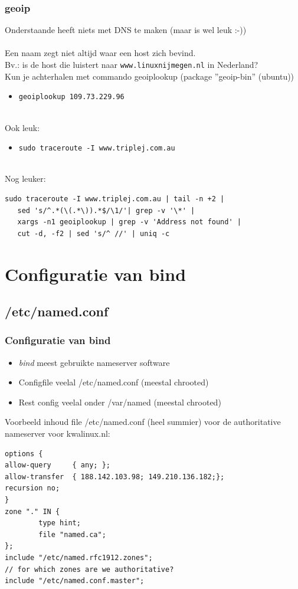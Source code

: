 \begin{styleframefrag}
        \frametitle{geoip}
{\footnotesize Onderstaande heeft niets met DNS te maken (maar is wel leuk :-))}
~\\
~\\
Een naam zegt niet altijd waar een host zich bevind.\\
Bv.: is de host die luistert naar {\tt www.linuxnijmegen.nl} in Nederland?\\
Kun je achterhalen met commando geoiplookup (package ''geoip-bin'' (ubuntu))
\begin{itemize}
	\item[] {\tt geoiplookup 109.73.229.96}
\end{itemize}
~\\
\pause
Ook leuk:
\begin{itemize}
	\item[] {\tt sudo traceroute -I www.triplej.com.au}
\end{itemize}
~\\
\pause
Nog leuker:
\scriptsize
\begin{verbatim}
sudo traceroute -I www.triplej.com.au | tail -n +2 | 
   sed 's/^.*(\(.*\)).*$/\1/'| grep -v '\*' |
   xargs -n1 geoiplookup | grep -v 'Address not found' |
   cut -d, -f2 | sed 's/^ //' | uniq -c
\end{verbatim}
\end{styleframefrag}

\section{Configuratie van bind}
\subsection{/etc/named.conf}
\begin{styleframefrag}
        \frametitle{Configuratie van bind}
\begin{itemize}
	\item {\it bind} meest gebruikte nameserver software
	\item Configfile veelal /etc/named.conf (meestal chrooted)
	\item Rest config veelal onder /var/named (meestal chrooted)
\end{itemize}
Voorbeeld inhoud file /etc/named.conf (heel summier) voor de authoritative nameserver voor kwalinux.nl:\\
{\scriptsize
\begin{verbatim}
options {
allow-query     { any; };
allow-transfer  { 188.142.103.98; 149.210.136.182;};
recursion no;
}
zone "." IN {
        type hint;
        file "named.ca";
};
include "/etc/named.rfc1912.zones";
// for which zones are we authoritative?
include "/etc/named.conf.master";
\end{verbatim}
}
\end{styleframefrag}

